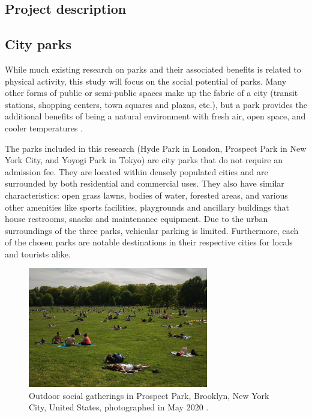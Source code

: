 \begin{multicols}{2}

\section{Project description}
\subsection{City parks}
While much existing research on parks and their associated benefits is related to physical activity, this study will focus on the social potential of parks. Many other forms of public or semi-public spaces make up the fabric of a city (transit stations, shopping centers, town squares and plazas, etc.), but a park provides the additional benefits of being a natural environment with fresh air, open space, and cooler temperatures \cite{aram_urban_2020}. 

The parks included in this research (Hyde Park in London, Prospect Park in New York City, and Yoyogi Park in Tokyo) are city parks that do not require an admission fee. They are located within densely populated cities and are surrounded by both residential and commercial uses. They also have similar characteristics: open grass lawns, bodies of water, forested areas, and various other amenities like sports facilities, playgrounds and ancillary buildings that house restrooms, snacks and maintenance equipment. Due to the urban surroundings of the three parks, vehicular parking is limited. Furthermore, each of the chosen parks are notable destinations in their respective cities for locals and tourists alike. 

\end{multicols}

\begin{figure}[h!]
\centering
\includegraphics[width=0.70\textwidth]{images/introduction/prospect1.png}
\captionsetup{width=0.70\linewidth}
\caption[Prospect Park]{Outdoor social gatherings in Prospect Park, Brooklyn, New York City, United States, photographed in  May 2020 \cite{noauthor_ny_2020}.}
\label{fig:prospect_park}
\end{figure}\par\hspace{10pt}

